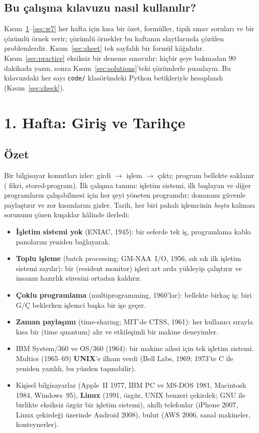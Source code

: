 \subsection{Bu çalışma kılavuzu nasıl kullanılır?}
Kısım~\ref{sec:w1}--\ref{sec:w7} her hafta için kısa bir özet, formüller, tipik sınav soruları ve bir çözümlü örnek verir; çözümlü örnekler bu haftanın slaytlarında çözülen problemlerdir. Kısım~\ref{sec:sheet} tek sayfalık bir formül kâğıdıdır. Kısım~\ref{sec:practice} eksiksiz bir deneme sınavıdır: hiçbir şeye bakmadan $90$ dakikada yazın, sonra Kısım~\ref{sec:solutions}'teki çözümlerle puanlayın. Bu kılavuzdaki her sayı \texttt{code/} klasöründeki Python betikleriyle hesaplandı (Kısım~\ref{sec:check}).

\section{1. Hafta: Giriş ve Tarihçe}
\label{sec:w1}
\subsection*{Özet}
Bir bilgisayar komutları izler: girdi $\to$ işlem $\to$ çıktı; program bellekte saklanır ( fikri, stored-program). İlk çalışma tanımı: işletim sistemi, ilk başlayan ve diğer programların çalışabilmesi için her şeyi yöneten programdır; donanımı güvenle paylaştırır ve zor kısımlarını gizler. Tarih, her biri pahalı işlemcinin \emph{boşta} kalması sorununu çözen kuşaklar hâlinde ilerledi:
\begin{itemize}
  \item \textbf{İşletim sistemi yok} (ENIAC, 1945): bir seferde tek iş, programlama kablo panolarını yeniden bağlayarak.
  \item \textbf{Toplu işleme} (batch processing; GM-NAA~I/O, 1956, sık sık ilk işletim sistemi sayılır): bir  (resident monitor) işleri art arda yükleyip çalıştırır ve insanın hazırlık süresini ortadan kaldırır.
  \item \textbf{Çoklu programlama} (multiprogramming, 1960'lar): bellekte birkaç iş; biri G/Ç beklerken işlemci başka bir işe geçer.
  \item \textbf{Zaman paylaşımı} (time-sharing; MIT'de CTSS, 1961): her kullanıcı sırayla kısa bir  (time quantum) alır ve etkileşimli bir makine deneyimler.
  \item IBM System/360 ve OS/360 (1964): bir makine ailesi için tek işletim sistemi. Multics (1965--69) \textbf{UNIX}'e ilham verdi (Bell Labs, 1969; 1973'te C ile yeniden yazıldı, bu yüzden taşınabilir).
  \item Kişisel bilgisayarlar (Apple~II 1977, IBM PC ve MS-DOS 1981, Macintosh 1984, Windows~95), \textbf{Linux} (1991, özgür, UNIX benzeri çekirdek; GNU ile birlikte eksiksiz özgür bir işletim sistemi), akıllı telefonlar (iPhone 2007, Linux çekirdeği üzerinde Android 2008), bulut (AWS 2006, sanal makineler, konteynerler).
\end{itemize}

